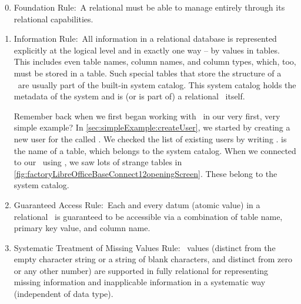 \begin{enumerate}%
\setcounter{enumi}{-1}%
%
\item Foundation Rule:~A relational  must be able to manage  entirely through its relational capabilities.%
%
\item Information Rule:~All information in a relational database is represented explicitly at the logical level and in exactly one way -- by values in tables.
This includes even table names, column names, and column types, which, too, must be stored in a table.
Such special tables that store the structure of a \db\ are usually part of the built-in system catalog.
This system catalog holds the metadata of the system and is (or is part of) a relational \db\ itself.

Remember back when we first began working with \postgresql\ in our very first, very simple example?
In \cref{sec:simpleExample:createUser}, we started by creating a new user for the  called .
We checked the list of existing users by writing .
 is the name of a table, which belongs to the system catalog.
When we connected to our \db\ using \libreofficeBase, we saw lots of strange tables in \cref{fig:factoryLibreOfficeBaseConnect12openingScreen}.
These belong to the system catalog.%
%
\item Guaranteed Access Rule:~Each and every datum (atomic value) in a relational \db\ is guaranteed to be accessible via a combination of table name, primary key value, and column name.%
%
\item Systematic Treatment of Missing Values Rule:~ values (distinct from the empty character string or a string of blank characters, and distinct from zero or any other number) are supported in fully relational  for representing missing information and inapplicable information in a systematic way (independent of data type).


\end{enumerate}
